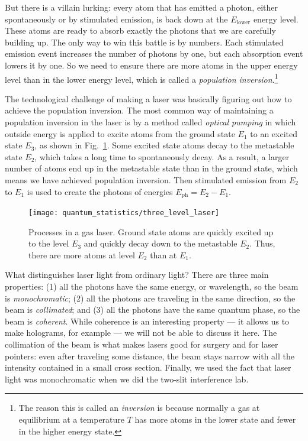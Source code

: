 But there is a villain lurking:
every atom that has emitted a photon, either spontaneously or
by stimulated emission, is back down at the $E_\text{lower}$ energy
level.  These atoms are ready to absorb exactly the photons that
we are carefully building up.  The only way to win this battle is by
numbers.  Each stimulated emission event increases the number of
photons by one, but each absorption event lowers it by one.  So we
need to ensure there are more atoms in the upper energy level than in
the lower energy level, which is called a \textit{population
  inversion}.\footnote{The reason this is called an {\it inversion} is
  because normally a gas at equilibrium at a temperature $T$ has more
  atoms in the lower state and fewer in the higher energy state.}

The technological challenge of making a laser was basically figuring
out how to achieve the population inversion.  The most common way of
maintaining a population inversion in the laser is by a method called
{\it optical pumping} in which outside energy is applied to excite
atoms from the ground state $E_1$ to an excited state $E_3$, as shown
in Fig.~\ref{fig:three_level_laser}.  Some excited state atoms decay
to the metastable state $E_2$, which takes a long time to
spontaneously decay.  As a result, a larger number of atoms end up in
the metastable state than in the ground state, which means we have
achieved population inversion.  Then stimulated emission from $E_2$ to
$E_1$ is used to create the photons of energies $E_\text{ph}=E_2 -
E_1$.

\begin{figure}
\begin{center}
\texttt{[image: quantum\_statistics/three\_level\_laser]}
\caption{Processes in a gas laser.  Ground state atoms are quickly
  excited up to the level $E_3$ and quickly decay down to the
  metastable $E_2$.  Thus, there are more atoms at level $E_2$ than at
  $E_1$.}
\label{fig:three_level_laser}
\end{center}
\end{figure}

What distinguishes laser light from ordinary light?  There are three
main properties: (1) all the photons have the same energy, or
wavelength, so the beam is \textit{monochromatic}; (2) all the photons
are traveling in the same direction, so the beam is
\textit{collimated}; and (3) all the photons have the same quantum
phase, so the beam is \textit{coherent}.  While coherence is an
interesting property --- it allows us to make holograms, for example
--- we will not be able to discuss it here.  The collimation of the
beam is what makes lasers good for surgery and for laser pointers:
even after traveling some distance, the beam stays narrow with all
the intensity contained in a small cross section.  Finally, we used the fact
that laser light was monochromatic when we did the two-slit interference
lab.

